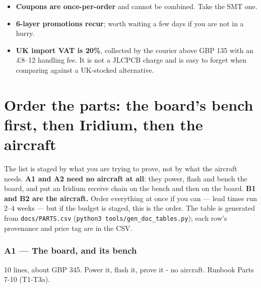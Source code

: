 \documentclass[11pt,a4paper]{article}
\newcommand{\file}[1]{\texttt{\small #1}}
\newcommand{\cmd}[1]{\texttt{\small #1}}
\begin{document}
\begin{itemize}
\item \textbf{Coupons are once-per-order} and cannot be combined. Take the SMT one.
\item \textbf{6-layer promotions recur}; worth waiting a few days if you are not in a hurry.
\item \textbf{UK import VAT is 20\%}, collected by the courier above GBP 135 with an
£8--12 handling fee. It is not a JLCPCB charge and is easy to forget when comparing
against a UK-stocked alternative.
\end{itemize}

\section{Order the parts: the board's bench first, then Iridium, then the aircraft}
\label{sec:parts}

The list is staged by what you are trying to prove, not by what the aircraft needs.
\textbf{A1 and A2 need no aircraft at all}: they power, flash and bench the board, and
put an Iridium receive chain on the bench and then on the board. \textbf{B1 and B2 are the
aircraft.} Order everything at once if you can --- lead times run 2--4 weeks --- but if the
budget is staged, this is the order. The table is generated from \file{docs/PARTS.csv}
(\cmd{python3 tools/gen\_doc\_tables.py}); each row's provenance and price tag are in the
CSV.

\subsubsection*{A1 --- The board, and its bench} 10 lines, about GBP 345.
Power it, flash it, prove it - no aircraft. Runbook Parts 7-10 (T1-T3a).
\end{document}
